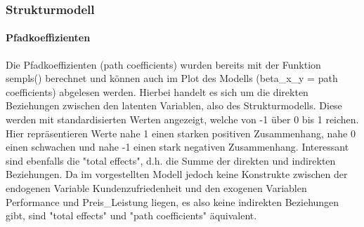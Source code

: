 \documentclass{article}\usepackage[]{graphicx}\usepackage[]{color}
\begin{document}
\subsubsection{Strukturmodell}

\paragraph{Pfadkoeffizienten}

Die Pfadkoeffizienten (path coefficients) wurden bereits mit der Funktion sempls() berechnet und können auch im Plot des Modells (beta\_x\_y = path coefficients) abgelesen werden. Hierbei handelt es sich um die direkten Beziehungen zwischen den latenten Variablen, also des Strukturmodells. Diese werden mit standardisierten Werten angezeigt, welche von -1 über 0 bis 1 reichen. Hier repräsentieren Werte nahe 1 einen starken positiven Zusammenhang, nahe 0 einen schwachen und nahe -1 einen stark negativen Zusammenhang. Interessant sind ebenfalls die "total effects", d.h. die Summe der direkten und indirekten Beziehungen. Da im vorgestellten Modell jedoch keine Konstrukte zwischen der endogenen Variable Kundenzufriedenheit und den exogenen Variablen Performance und Preis\_Leistung liegen, es also keine indirekten Beziehungen gibt, sind "total effects" und "path coefficients" äquivalent.
\end{document}
